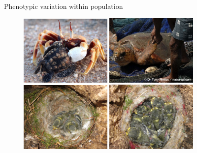 \documentclass[10pt]{beamer}%
\begin{document}
\begin{frame}{Phenotypic variation within population}
	\begin{figure}
		\includegraphics[width=0.4\textwidth,height=0.3\textwidth]{Figures/babyTurtle} \hspace{1pt}
		\includegraphics[width=0.4\textwidth,height=0.3\textwidth]{Figures/adultTurtle}
		\vspace{1pt}
		\includegraphics[width=0.4\textwidth,height=0.3\textwidth]{Figures/BlueTits2}\hspace{1pt}
		\includegraphics[width=0.4\textwidth,height=0.3\textwidth]{Figures/BlueTits8}
	\end{figure}
\end{frame}
\end{document}
